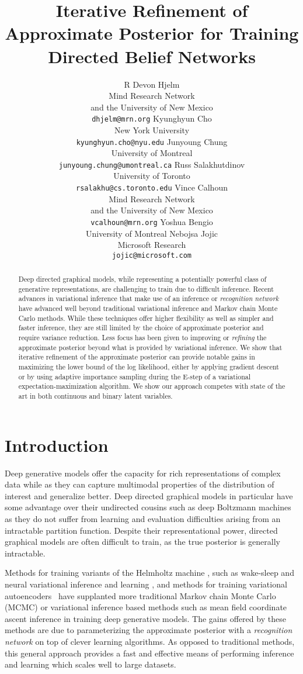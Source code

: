 \documentclass{article} %
\title{Iterative Refinement of Approximate Posterior for Training Directed Belief Networks}
\author{R Devon Hjelm \\
Mind Research Network \\and the University of New Mexico \\
\texttt{dhjelm@mrn.org} 
\And
Kyunghyun Cho \\
New York University \\
\texttt{kyunghyun.cho@nyu.edu}
\And
Junyoung Chung \\
University of Montreal \\
\texttt{junyoung.chung@umontreal.ca}
\And
Russ Salakhutdinov \\
University of Toronto \\
\texttt{rsalakhu@cs.toronto.edu}
\And
Vince Calhoun \\
Mind Research Network \\and the University of New Mexico \\
\texttt{vcalhoun@mrn.org}
\And
Yoshua Bengio \\
University of Montreal
\And
Nebojsa Jojic \\
Microsoft Research \\
\texttt{jojic@microsoft.com}
}
\begin{document}
\maketitle

\begin{abstract}
    Deep directed graphical models, while representing a potentially powerful
    class of generative representations, are challenging to train due to difficult inference. Recent advances in variational inference that make use
    of an inference or \emph{recognition network} have advanced well beyond
    traditional variational inference and Markov chain Monte Carlo methods. While these techniques
    offer higher flexibility as well as simpler and faster inference, they are
    still limited by the choice of approximate posterior and require variance
    reduction. Less focus has been given to improving or \emph{refining} the
    approximate posterior beyond what is provided by variational inference. We
    show that iterative refinement of the approximate posterior can provide
    notable gains in maximizing the lower bound of the log likelihood, either
    by applying gradient descent or by using adaptive importance sampling
    during the E-step of a variational expectation-maximization algorithm. We show our approach
    competes with state of the art in both continuous and binary latent
    variables.
    \end{abstract}

\section{Introduction}

Deep generative models offer the capacity for rich representations of complex
data while as they can capture multimodal properties of the distribution of
interest and generalize better. Deep directed
graphical models in particular have some advantage over their undirected
cousins such as deep Boltzmann machines \citep[DBMs,][]{salakhutdinov2009deep} as they do not suffer from
learning and evaluation difficulties arising from an intractable partition
function. Despite their representational power, directed graphical models are
often difficult to train, as the true posterior is generally intractable.

Methods for training variants of the Helmholtz machine
\citep{dayan1995helmholtz}, such as wake-sleep \citep{hinton1995wake,
bornschein2014reweighted} and neural variational inference and learning
\citep[NVIL,][]{mnih2014neural}, and methods for training variational autoencoders~
\citep[VAE,][]{kingma2013auto} have supplanted more traditional Markov chain Monte
Carlo (MCMC) or variational inference based methods such as mean field
coordinate ascent inference in training deep generative models. The gains
offered by these methods are due to parameterizing the approximate posterior
with a \emph{recognition network} on top of clever learning algorithms. As
opposed to traditional methods, this general approach provides a fast and
effective means of performing inference and learning which scales well to large
datasets.
\end{document}
